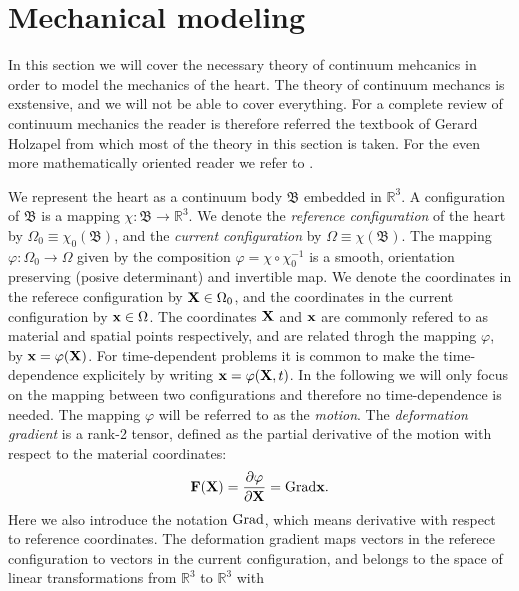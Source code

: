 \section{Mechanical modeling}
\label{sec:intro_mechanical}

In this section we will cover the necessary theory of continuum
mehcanics in order to model the mechanics of the heart. The theory of
continuum mechancs is exstensive, and we will not be able to cover
everything. For a complete review of continuum mechanics the reader is
therefore referred the textbook of Gerard Holzapel
\cite{holzapfel2000nonlinear} from which most of the theory in this
section is taken. For the even more mathematically oriented reader we
refer to \cite{marsden1994mathematical}.

We represent the heart as a continuum body $\mathfrak{B}$ embedded in
$\mathbb{R}^3$. A configuration of $\mathfrak{B}$ is a mapping $\chi:
\mathfrak{B} \rightarrow \mathbb{R}^3$. 
We denote the \emph{reference configuration} of the heart by $\Omega_0
\equiv \chi_0(\mathfrak{B})$, and the \emph{current configuration} by $\Omega
\equiv \chi(\mathfrak{B})$. The mapping $\varphi :  \Omega_0
\rightarrow \Omega$ given by the composition $\varphi = \chi
\circ \chi_0^{-1}$ is a smooth, orientation preserving (posive
determinant) and invertible map. We denote the coordinates in the
referece configuration by $\mathbf{X} \in \Omega_0$, and the coordinates in the current
configuration by $\mathbf{x} \in \Omega$. The coordinates $\mathbf{X}$ and $\mathbf{x}$ are
commonly refered to as material and spatial points respectively, and
are related throgh the mapping $\varphi$, by $\mathbf{x} = \varphi(\mathbf{X})$.
For time-dependent problems it is common to make  the time-dependence
explicitely by writing $\mathbf{x} = \varphi(\mathbf{X}, t)$. In the following
we will only focus on the mapping between two configurations and
therefore no time-dependence is needed. The mapping $\varphi$ will be
referred to as the \emph{motion}. The \emph{deformation gradient} is a
rank-2 tensor, defined as the partial derivative of the motion with
respect to the material coordinates:
\begin{align}
  \mathbf{F}(\mathbf{X}) = \frac{\partial \varphi}{\partial \mathbf{X}} = \mathrm{Grad} \mathbf{x}.
  \label{eq:deformation_gradient}
\end{align}
Here we also introduce the notation $\mathrm{Grad}$, which means derivative
with respect to reference coordinates.
The deformation gradient maps vectors in the referece configuration to
vectors in the current configuration, and belongs to the space of
linear transformations from $\mathbb{R}^3$ to $\mathbb{R}^3$ with
